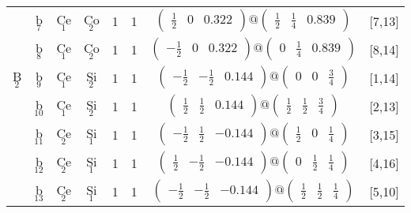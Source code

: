 \documentclass[fleqn,10pt,landscape]{article}
\begin{document}
\begin{itemize}
\begin{center}
\begin{longtable}{cc|cc|c|c|c|l}
& b$_{7}$ & Ce$_{1}$ & Co$_{2}$ & 1 & 1 & $\begin{pmatrix} \frac{1}{2} & 0 & 0.322 \end{pmatrix}@\begin{pmatrix} \frac{1}{2} & \frac{1}{4} & 0.839 \end{pmatrix}$ & [7,13] \\
& b$_{8}$ & Ce$_{1}$ & Co$_{2}$ & 1 & 1 & $\begin{pmatrix} - \frac{1}{2} & 0 & 0.322 \end{pmatrix}@\begin{pmatrix} 0 & \frac{1}{4} & 0.839 \end{pmatrix}$ & [8,14] \\ \hline
B$_{2}$ & b$_{9}$ & Ce$_{1}$ & Si$_{2}$ & 1 & 1 & $\begin{pmatrix} - \frac{1}{2} & - \frac{1}{2} & 0.144 \end{pmatrix}@\begin{pmatrix} 0 & 0 & \frac{3}{4} \end{pmatrix}$ & [1,14] \\
& b$_{10}$ & Ce$_{1}$ & Si$_{2}$ & 1 & 1 & $\begin{pmatrix} \frac{1}{2} & \frac{1}{2} & 0.144 \end{pmatrix}@\begin{pmatrix} \frac{1}{2} & \frac{1}{2} & \frac{3}{4} \end{pmatrix}$ & [2,13] \\
& b$_{11}$ & Ce$_{2}$ & Si$_{1}$ & 1 & 1 & $\begin{pmatrix} - \frac{1}{2} & \frac{1}{2} & -0.144 \end{pmatrix}@\begin{pmatrix} \frac{1}{2} & 0 & \frac{1}{4} \end{pmatrix}$ & [3,15] \\
& b$_{12}$ & Ce$_{2}$ & Si$_{1}$ & 1 & 1 & $\begin{pmatrix} \frac{1}{2} & - \frac{1}{2} & -0.144 \end{pmatrix}@\begin{pmatrix} 0 & \frac{1}{2} & \frac{1}{4} \end{pmatrix}$ & [4,16] \\
& b$_{13}$ & Ce$_{2}$ & Si$_{1}$ & 1 & 1 & $\begin{pmatrix} - \frac{1}{2} & - \frac{1}{2} & -0.144 \end{pmatrix}@\begin{pmatrix} \frac{1}{2} & \frac{1}{2} & \frac{1}{4} \end{pmatrix}$ & [5,10] \\

\end{longtable}
\end{center}
\end{itemize}
\end{document}
